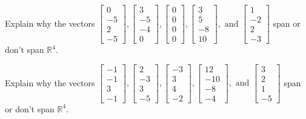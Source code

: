 \documentclass{article}
\begin{document}
\begin{exerciseStatement}
    Explain why the vectors \(\left[\begin{array}{r}
0 \\
-5 \\
2 \\
-5
\end{array}\right] , \left[\begin{array}{r}
3 \\
-5 \\
-4 \\
0
\end{array}\right] , \left[\begin{array}{r}
0 \\
0 \\
0 \\
0
\end{array}\right] , \left[\begin{array}{r}
3 \\
5 \\
-8 \\
10
\end{array}\right] , \text{ and } \left[\begin{array}{r}
1 \\
-2 \\
2 \\
-3
\end{array}\right]\) span or don't span \(\mathbb{R}^4\).



  
\end{exerciseStatement}

\begin{exerciseStatement}
    Explain why the vectors \(\left[\begin{array}{r}
-1 \\
-1 \\
3 \\
-1
\end{array}\right] , \left[\begin{array}{r}
2 \\
-3 \\
3 \\
-5
\end{array}\right] , \left[\begin{array}{r}
-3 \\
3 \\
4 \\
-2
\end{array}\right] , \left[\begin{array}{r}
12 \\
-10 \\
-8 \\
-4
\end{array}\right] , \text{ and } \left[\begin{array}{r}
3 \\
2 \\
1 \\
-5
\end{array}\right]\) span or don't span \(\mathbb{R}^4\).



  
\end{exerciseStatement}
\end{document}
